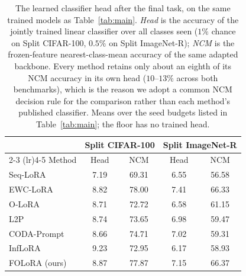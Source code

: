 \begin{table}[tbp]
\centering\small
\caption{The learned classifier head after the final task, on the same trained models as
Table~\ref{tab:main}. \emph{Head} is the accuracy of the jointly trained linear classifier
over all classes seen ($1\%$ chance on Split CIFAR-100, $0.5\%$ on Split ImageNet-R);
\emph{NCM} is the frozen-feature nearest-class-mean accuracy of the same adapted backbone.
Every method retains only about an eighth of its NCM accuracy in its own head ($10$--$13\%$
across both benchmarks), which is the reason we adopt a common NCM decision rule for the
comparison rather than each method's published classifier. Means over the seed budgets listed in Table~\ref{tab:main}; the floor has no
trained head.}
\label{tab:head-acc}
\setlength{\tabcolsep}{6pt}
\begin{tabular}{@{}lcccc@{}}
\toprule
& \multicolumn{2}{c}{Split CIFAR-100} & \multicolumn{2}{c}{Split ImageNet-R} \\
\cmidrule(lr){2-3} \cmidrule(lr){4-5}
Method & Head & NCM & Head & NCM \\
\midrule
Seq-LoRA     & 7.19 & 69.31 & 6.55 & 56.58 \\
EWC-LoRA     & 8.82 & 78.00 & 7.41 & 66.33 \\
O-LoRA       & 8.71 & 72.72 & 6.58 & 61.15 \\
L2P          & 8.74 & 73.65 & 6.98 & 59.47 \\
CODA-Prompt  & 8.66 & 74.71 & 7.02 & 59.31 \\
InfLoRA      & 9.23 & 72.95 & 6.17 & 58.93 \\
\midrule
FOLoRA (ours)& 8.87 & 77.87 & 7.15 & 66.37 \\
\bottomrule
\end{tabular}
\end{table}
